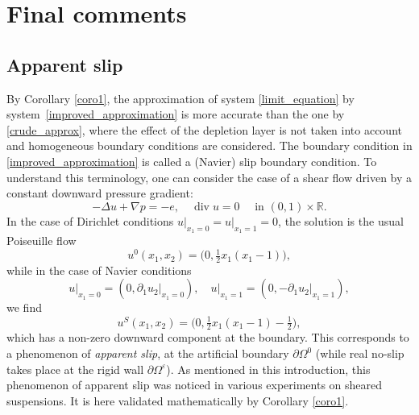 \documentclass[JEP,XML,SOM,Unicode,NoEqCountersInSection,published]{cedram}
\renewcommand{\div}{\operatorname{div}}
\theoremstyle{plain}
\theoremstyle{definition}
\let\pa\partial
\let\na\nabla
\let\eps\varepsilon
\newcommand{\R}{\mathbb{R}}
\begin{document}
\section{Final comments} \label{sec_final_comments}

\subsection{Apparent slip} \label{subsec_apparent}
By Corollary \ref{coro1}, the approximation of system \eqref{limit_equation} by system~\eqref{improved_approximation} is more accurate than the one by \eqref{crude_approx}, where the effect of the depletion layer is not taken into account and homogeneous boundary conditions are considered. The boundary condition in \eqref{improved_approximation} is called a (Navier) slip boundary condition. To understand this terminology, one can consider the case of a shear flow driven by a constant downward pressure gradient:
\[
- \Delta u + \na p = - e, \quad \div u = 0 \quad \text{ in } (0,1) \times \R.
\]
In the case of Dirichlet conditions $u\vert_{x_1=0} = u\vert_{x_1=1} = 0$, the solution is the usual Poiseuille flow
\[
u^0(x_1,x_2) = \big(0, \tfrac{1}{2} x_1 (x_1-1)\big),
\]
while in the case of Navier conditions
\[
u\vert_{x_1=0} = (0, \pa_1 u_2\vert_{x_1=0}), \quad u\vert_{x_1=1} = (0, -\pa_1 u_2\vert_{x_1=1}),
\]
we find
\[
u^S(x_1,x_2) = \big(0,\tfrac{1}{2} x_1 (x_1-1) - \tfrac12\big),
\]
which has a non-zero downward component at the boundary. This corresponds to a phenomenon of {\em apparent slip}, at the artificial boundary $\pa \Omega^0$ (while real no-slip takes place at the rigid wall $\pa \Omega^\eps$). As mentioned in this introduction, this phenomenon of apparent slip was noticed in various experiments on sheared suspensions. It is here validated mathematically by Corollary \ref{coro1}.
\end{document}
